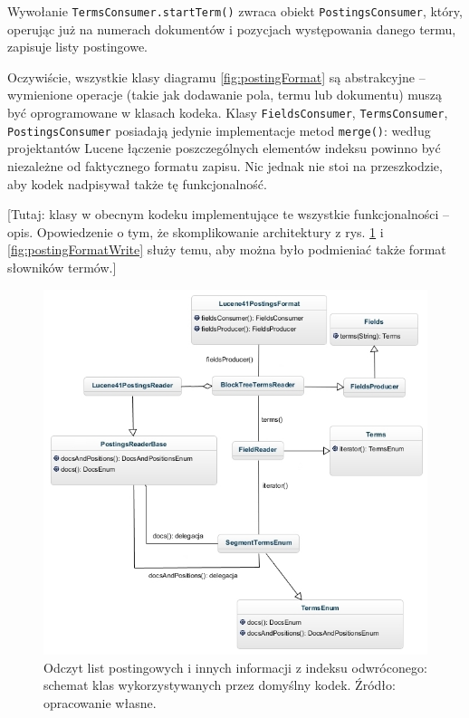 Wywołanie \texttt{TermsConsumer.startTerm()} zwraca obiekt \texttt{PostingsConsumer}, który, operując już na numerach dokumentów i pozycjach występowania danego termu, zapisuje listy postingowe.

Oczywiście, wszystkie klasy diagramu \ref{fig:postingFormat} są abstrakcyjne -- wymienione operacje (takie jak dodawanie pola, termu lub dokumentu) muszą być oprogramowane w klasach kodeka. Klasy \texttt{FieldsConsumer}, \texttt{TermsConsumer}, \texttt{PostingsConsumer} posiadają jedynie implementacje metod \texttt{merge()}: według projektantów Lucene łączenie poszczególnych elementów indeksu powinno być niezależne od faktycznego formatu zapisu. Nic jednak nie stoi na przeszkodzie, aby kodek nadpisywał także tę funkcjonalność.

[Tutaj: klasy w obecnym kodeku implementujące te wszystkie funkcjonalności -- opis. Opowiedzenie o tym, że skomplikowanie architektury z rys. \ref{fig:postingFormatRead} i \ref{fig:postingFormatWrite} służy temu, aby można było podmieniać także format słowników termów.]

\begin{figure}[here]
 \includegraphics[scale=0.62]{pictures/Lucene41PostingsFormatRead_1.jpg}
 \caption{Odczyt list postingowych i innych informacji z indeksu odwróconego: schemat klas wykorzystywanych przez domyślny kodek. Źródło: opracowanie własne. \label{fig:postingFormatRead}}
\end{figure}

